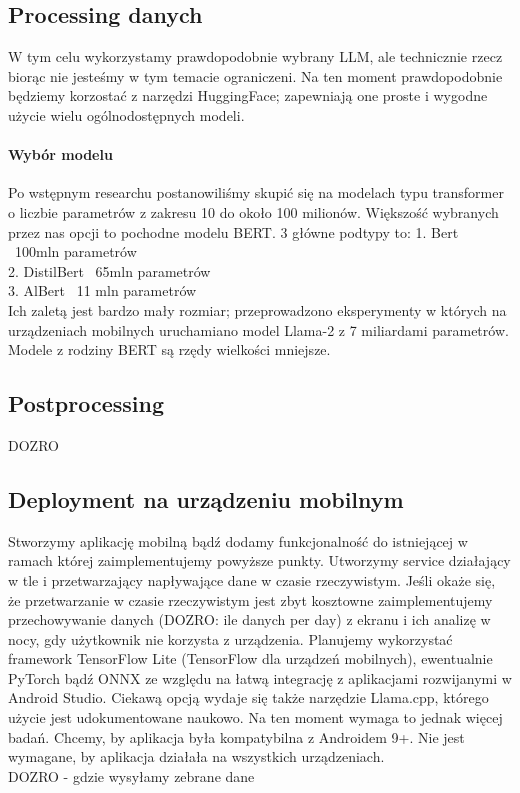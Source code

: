 \documentclass[12pt]{article}
\begin{document}
\subsection*{Processing danych}
W tym celu wykorzystamy prawdopodobnie wybrany LLM, ale technicznie rzecz biorąc nie jesteśmy w tym temacie ograniczeni. Na ten moment prawdopodobnie będziemy korzostać z narzędzi HuggingFace; zapewniają one proste i wygodne użycie wielu ogólnodostępnych modeli.
\paragraph{Wybór modelu}
Po wstępnym researchu postanowiliśmy skupić się na modelach typu transformer o liczbie parametrów z zakresu 10 do około 100 milionów. Większość wybranych przez nas opcji to pochodne modelu BERT\cite{devlin2019bertpretrainingdeepbidirectional}. 3 główne podtypy to:
1. Bert ~100mln parametrów \\
2. DistilBert ~65mln parametrów \\
3. AlBert ~11 mln parametrów \\
Ich zaletą jest bardzo mały rozmiar; przeprowadzono eksperymenty\cite{LLMmobile2024} w których na urządzeniach mobilnych uruchamiano model Llama-2 z 7 miliardami parametrów. Modele z rodziny BERT są rzędy wielkości mniejsze.
\subsection*{Postprocessing}
DOZRO
\subsection*{Deployment na urządzeniu mobilnym}
Stworzymy aplikację mobilną bądź dodamy funkcjonalność do istniejącej w ramach której zaimplementujemy powyższe punkty. Utworzymy service działający w tle i przetwarzający napływające dane w czasie rzeczywistym. Jeśli okaże się, że przetwarzanie w czasie rzeczywistym jest zbyt kosztowne zaimplementujemy przechowywanie danych (DOZRO: ile danych per day) z ekranu i ich analizę w nocy, gdy użytkownik nie korzysta z urządzenia. Planujemy wykorzystać framework TensorFlow Lite (TensorFlow dla urządzeń mobilnych), ewentualnie PyTorch bądź ONNX ze względu na łatwą integrację z aplikacjami rozwijanymi w Android Studio.
Ciekawą opcją wydaje się także narzędzie Llama.cpp, którego użycie jest udokumentowane naukowo\cite{LLMmobile2024}. Na ten moment wymaga to jednak więcej badań. Chcemy, by aplikacja była kompatybilna z Androidem 9+. Nie jest wymagane, by aplikacja działała na wszystkich urządzeniach.\\
DOZRO - gdzie wysyłamy zebrane dane
\end{document}
